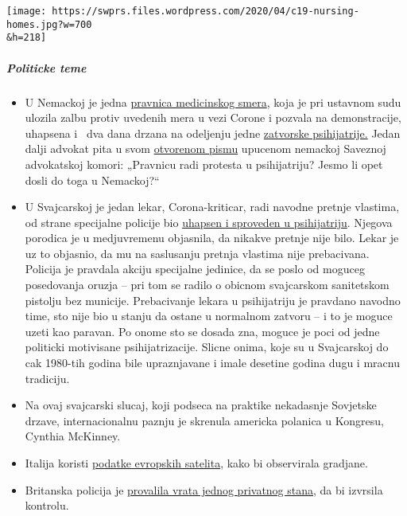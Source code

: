 \texttt{[image: https://swprs.files.wordpress.com/2020/04/c19-nursing-homes.jpg?w=700\\\&h=218]}

\hypertarget{politicke-teme}{%
\subparagraph{\texorpdfstring{\textbf{Politicke
teme}}{Politicke teme}}\label{politicke-teme}}

\begin{itemize}
\tightlist
\item
  U Nemackoj je jedna \href{http://beatebahner.de/}{pravnica medicinskog
  smera}, koja je pri ustavnom sudu ulozila zalbu protiv uvedenih mera u
  vezi Corone i pozvala na demonstracije, uhapsena i ~dva dana drzana na
  odeljenju jedne
  \href{https://www.rnz.de/nachrichten/heidelberg_artikel,-nach-aufruf-zu-corona-demo-heidelberger-anwaeltin-aus-psychiatrischer-einrichtung-entlassen-150-unte-_arid,508747.html}{zatvorske
  psihijatrije.} Jedan dalji advokat pita u svom
  \href{https://www.nachrichtenspiegel.de/2020/04/14/brief-an-die-bundesrechtsanwaltskammer-in-causa-bahmer/}{otvorenom
  pismu} upucenom nemackoj Saveznoj advokatskoj komori: „Pravnicu radi
  protesta u psihijatriju? Jesmo li opet dosli do toga u Nemackoj?``
\item
  U Svajcarskoj je jedan lekar, Corona-kriticar, radi navodne pretnje
  vlastima, od strane specijalne policije bio
  \href{https://www.srf.ch/news/regional/aargau-solothurn/festnahme-von-corona-kritiker-verschwoerung-oder-normale-intervention-der-aargauer-behoerden}{uhapsen
  i sproveden u psihijatriju}. Njegova porodica je u medjuvremenu
  objasnila, da nikakve pretnje nije bilo. Lekar je uz to objasnio, da
  mu na saslusanju pretnja vlastima nije prebacivana. Policija je
  pravdala akciju specijalne jedinice, da se poslo od moguceg
  posedovanja oruzja -- pri tom se radilo o obicnom svajcarskom
  sanitetskom pistolju bez municije. Prebacivanje lekara u psihijatriju
  je pravdano navodno time, sto nije bio u stanju da ostane u normalnom
  zatvoru -- i to je moguce uzeti kao paravan. Po onome sto se dosada
  zna, moguce je poci od jedne politicki motivisane psihijatrizacije.
  Slicne onima, koje su u Svajcarskoj do cak 1980-tih godina bile
  upraznjavane i imale desetine godina dugu i mracnu tradiciju.
\item
  Na ovaj svajcarski slucaj, koji podseca na praktike nekadasnje
  Sovjetske drzave, internacionalnu paznju je skrenula americka polanica
  u Kongresu, Cynthia McKinney.
\item
  Italija koristi
  \href{https://www.ansa.it/english/news/2020/04/06/coronavirus-italy-activates-satellite-to-monitor-nation-3_f2ffb30c-d550-42f5-82fc-ec1f82c5c625.html}{podatke
  evropskih satelita}, kako bi observirala gradjane.
\item
  Britanska policija je
  \href{https://mail.protonmail.com/\#CoronaPolice}{provalila vrata
  jednog privatnog stana}, da bi izvrsila kontrolu.
\end{itemize}

